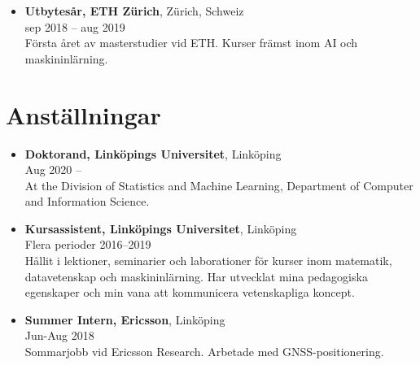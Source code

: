 \documentclass[12pt]{article}
\newcommand{\text}[2]{#2}
\newcommand{\text}[2]{#1}
\begin{document}
\begin{itemize}
    \item \text{
            \textbf{Exchange Year, ETH Zürich}, Zürich, Switzerland\\
        Sep 2018 -- Aug 2019\\
        }{
            \textbf{Utbytesår, ETH Zürich}, Zürich, Schweiz\\
        sep 2018 -- aug 2019\\
        }
        \text{
            First year of my master as an exchange student at ETH. Courses mainly in machine learning and AI.
        }{
            Första året av masterstudier vid ETH. Kurser främst inom AI och maskininlärning.
        }

\end{itemize}

\section*{\text{Employment}{Anställningar}}
\begin{itemize}
    \item \textbf{\text{PhD Student, Linköping University}{Doktorand, Linköpings Universitet}}, Linköping\\
    Aug 2020 --\\
    At the Division of Statistics and Machine Learning, Department of Computer and Information Science.

    \item \textbf{\text{Teaching Assistant, Linköping University}{Kursassistent, Linköpings Universitet}}, Linköping\\
        \text{Multiple periods}{Flera perioder} 2016--2019\\
        \text{
            Held lessons, seminars and lab-sessions for courses in mathematics, computer science and machine learning. Developed my teaching skills and my ability to communicate scientific concepts.
        }{
            Hållit i lektioner, seminarier och laborationer för kurser inom matematik, datavetenskap och maskininlärning. Har utvecklat mina pedagogiska egenskaper och min vana att kommunicera vetenskapliga koncept.
        }
    \item \textbf{Summer Intern, Ericsson}, Linköping\\
        Jun-Aug 2018\\
        \text{
            Summer internship at Ericsson Research. Worked with GNSS positioning.
        }{
            Sommarjobb vid Ericsson Research. Arbetade med GNSS-positionering.
        }

\end{itemize}
\end{document}
